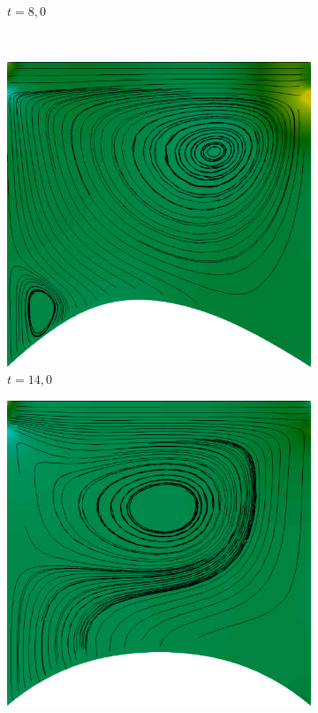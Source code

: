 \begin{figure}[h!]
\begin{subfigure}[b]{0.3\textwidth}
        \caption{$t=8,0$}
    \end{subfigure}\\
    \begin{subfigure}[b]{0.3\textwidth}
        \includegraphics[width=\linewidth]{Figuras/FSI-Cavity2D/t14.png}
        \caption{$t=14,0$}
    \end{subfigure}
    \begin{subfigure}[b]{0.3\textwidth}
        \includegraphics[width=\linewidth]{Figuras/FSI-Cavity2D/t21.png}

\end{subfigure}
\end{figure}
